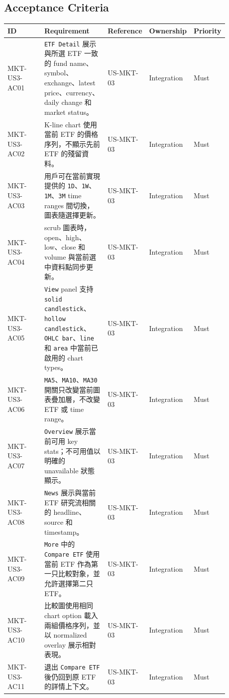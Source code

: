 \subsection{Acceptance Criteria}
\begingroup
\small
\begin{longtable}{L{0.18\linewidth}L{0.30\linewidth}L{0.18\linewidth}L{0.12\linewidth}L{0.10\linewidth}}
\toprule
\textbf{ID} & \textbf{Requirement} & \textbf{Reference} & \textbf{Ownership} & \textbf{Priority} \\
\midrule
MKT-US3-AC01 & \texttt{ETF Detail} 展示與所選 ETF 一致的 fund name、symbol、exchange、latest price、currency、daily change 和 market status。 & US-MKT-03 & Integration & Must \\
MKT-US3-AC02 & K-line chart 使用當前 ETF 的價格序列，不顯示先前 ETF 的殘留資料。 & US-MKT-03 & Integration & Must \\
MKT-US3-AC03 & 用戶可在當前實現提供的 \texttt{1D}、\texttt{1W}、\texttt{1M}、\texttt{3M} time ranges 間切換，圖表隨選擇更新。 & US-MKT-03 & Integration & Must \\
MKT-US3-AC04 & scrub 圖表時，open、high、low、close 和 volume 與當前選中資料點同步更新。 & US-MKT-03 & Integration & Must \\
MKT-US3-AC05 & \texttt{View} panel 支持 \texttt{solid candlestick}、\texttt{hollow candlestick}、\texttt{OHLC bar}、\texttt{line} 和 \texttt{area} 中當前已啟用的 chart types。 & US-MKT-03 & Integration & Must \\
MKT-US3-AC06 & \texttt{MA5}、\texttt{MA10}、\texttt{MA30} 開關只改變當前圖表疊加層，不改變 ETF 或 time range。 & US-MKT-03 & Integration & Must \\
MKT-US3-AC07 & \texttt{Overview} 展示當前可用 key stats；不可用值以明確的 unavailable 狀態顯示。 & US-MKT-03 & Integration & Must \\
MKT-US3-AC08 & \texttt{News} 展示與當前 ETF 研究流相關的 headline、source 和 timestamp。 & US-MKT-03 & Integration & Must \\
MKT-US3-AC09 & \texttt{More} 中的 \texttt{Compare ETF} 使用當前 ETF 作為第一只比較對象，並允許選擇第二只 ETF。 & US-MKT-03 & Integration & Must \\
MKT-US3-AC10 & 比較圖使用相同 chart option 載入兩組價格序列，並以 normalized overlay 展示相對表現。 & US-MKT-03 & Integration & Must \\
MKT-US3-AC11 & 退出 \texttt{Compare ETF} 後仍回到原 ETF 的詳情上下文。 & US-MKT-03 & Integration & Must \\
\bottomrule
\end{longtable}
\endgroup
\prdhr
\hypertarget{us-mkt-04}{}
